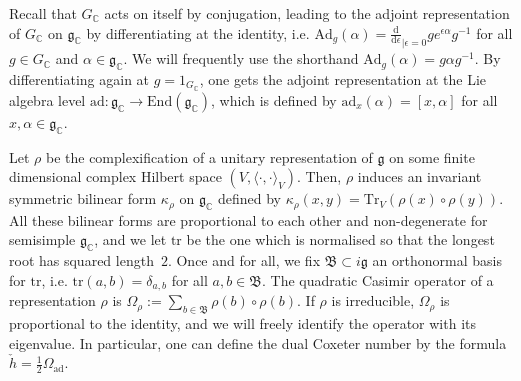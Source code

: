 \documentclass[12pt,a4paper]{amsart}
\numberwithin{equation}{section}
\newcounter{exa}
\theoremstyle{remark}
\newtheorem{example}{Example}
\theoremstyle{definition}
\newcommand{\kg}{\mathfrak g}
\newcommand{\C}{\mathbb C}
\renewcommand{\d}{\mathrm d}
\newcommand{\kB}{\mathfrak B}
\newcommand{\Ad}{\mathrm{Ad}}
\newcommand{\tr}{\mathrm{tr}}
\begin{document}
Recall that $G_\C$ acts on itself by conjugation, leading to the adjoint representation of $G_\C$ on $\kg_\C$ by differentiating at the identity, i.e. $\mathrm{Ad}_g(\alpha)=\frac{\d}{\d\epsilon}_{|\epsilon=0}ge^{\epsilon\alpha}g^{-1}$ for all $g\in G_\C$ and $\alpha\in\kg_\C$. We will frequently use the shorthand $\Ad_g(\alpha)=g\alpha g^{-1}$. By differentiating again at $g=1_{G_\C}$, one gets the adjoint representation at the Lie algebra level $\mathrm{ad}:\kg_\C\to\mathrm{End}(\kg_\C)$, which is defined by $\mathrm{ad}_x(\alpha)=[x,\alpha]$ for all $x,\alpha\in\kg_\C$.

Let $\rho$ be the complexification of a unitary representation of $\kg$ on some finite dimensional complex Hilbert space $(V,\langle\cdot,\cdot\rangle_V)$. Then, $\rho$ induces an invariant symmetric bilinear form $\kappa_\rho$ on $\kg_\C$ defined by $\kappa_\rho(x,y)=\mathrm{Tr}_V(\rho(x)\circ\rho(y))$. All these bilinear forms are proportional to each other and non-degenerate for semisimple $\kg_\C$, and we let $\tr$ be the one which is normalised so that the longest root has squared length~$2$. Once and for all, we fix $\kB\subset i\kg$ an orthonormal basis for $\tr$, i.e. $\tr(a,b)=\delta_{a,b}$ for all $a,b\in\kB$. The quadratic Casimir operator of a representation $\rho$ is $\Omega_\rho:=\sum_{b\in\kB}\rho(b)\circ\rho(b)$. If $\rho$ is irreducible, $\Omega_\rho$ is proportional to the identity, and we will freely identify the operator with its eigenvalue. In particular, one can define the dual Coxeter number by the formula $\check h=\frac{1}{2}\Omega_\mathrm{ad}$.
\end{document}
